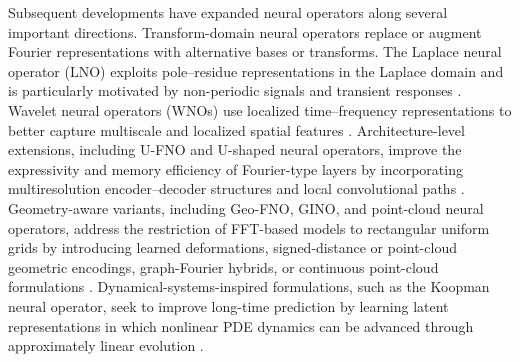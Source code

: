 \documentclass{article}
\begin{document}
Subsequent developments have expanded neural operators along several important directions. Transform-domain neural operators replace or augment Fourier representations with alternative bases or transforms. The Laplace neural operator (LNO) exploits pole--residue representations in the Laplace domain and is particularly motivated by non-periodic signals and transient responses \cite{cao2024laplace}. Wavelet neural operators (WNOs) use localized time--frequency representations to better capture multiscale and localized spatial features \cite{tripura2023wavelet}. Architecture-level extensions, including U-FNO and U-shaped neural operators, improve the expressivity and memory efficiency of Fourier-type layers by incorporating multiresolution encoder--decoder structures and local convolutional paths \cite{wen2022ufno,rahman2022uno}. Geometry-aware variants, including Geo-FNO, GINO, and point-cloud neural operators, address the restriction of FFT-based models to rectangular uniform grids by introducing learned deformations, signed-distance or point-cloud geometric encodings, graph-Fourier hybrids, or continuous point-cloud formulations \cite{li2023geofno,li2023gino,zeng2025pcno,han2026geometric}. Dynamical-systems-inspired formulations, such as the Koopman neural operator, seek to improve long-time prediction by learning latent representations in which nonlinear PDE dynamics can be advanced through approximately linear evolution \cite{xiong2024koopman,xiong2023koopmanlab}.
\end{document}
